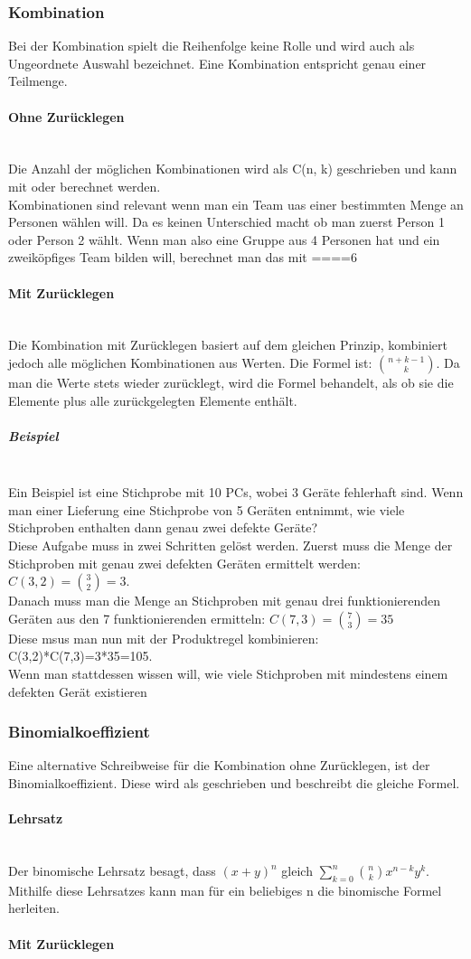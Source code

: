 \documentclass{article}
\newcommand{\paragraphlb}[1]{\paragraph{#1}\mbox{}\\}
\newcommand{\subparagraphlb}[1]{\subparagraph{#1}\mbox{}\\}
\begin{document}
	\subsubsection{Kombination}
	Bei der Kombination spielt die Reihenfolge keine Rolle und wird auch als Ungeordnete Auswahl bezeichnet. Eine Kombination entspricht genau einer Teilmenge. 
	\paragraphlb{Ohne Zurücklegen}
	Die Anzahl der möglichen Kombinationen wird als C(n, k) geschrieben und kann mit  oder  berechnet werden. \\
	Kombinationen sind relevant wenn man ein Team uas einer bestimmten Menge an Personen wählen will. Da es keinen Unterschied macht ob man zuerst Person 1 oder Person 2 wählt. Wenn man also eine Gruppe aus 4 Personen hat und ein zweiköpfiges Team bilden will, berechnet man das mit ====6
	\paragraphlb{Mit Zurücklegen}
	Die Kombination mit Zurücklegen basiert auf dem gleichen Prinzip, kombiniert jedoch alle möglichen Kombinationen aus Werten. Die Formel ist: $\binom{n+k-1}{k}$. Da man die Werte stets wieder zurücklegt, wird die Formel behandelt, als ob sie die Elemente plus alle zurückgelegten Elemente enthält.
	\subparagraphlb{Beispiel}
	Ein Beispiel ist eine Stichprobe mit 10 PCs, wobei 3 Geräte fehlerhaft sind. Wenn man einer Lieferung eine Stichprobe von 5 Geräten entnimmt, wie viele Stichproben enthalten dann genau zwei defekte Geräte? \\
	Diese Aufgabe muss in zwei Schritten gelöst werden. Zuerst muss die Menge der Stichproben mit genau zwei defekten Geräten ermittelt werden: $C(3,2)=\binom{3}{2}=3$. \\
	Danach muss man die Menge an Stichproben mit genau drei funktionierenden Geräten aus den 7 funktionierenden ermitteln: $C(7,3)=\binom{7}{3}=35$ \\
	Diese msus man nun mit der Produktregel kombinieren: C(3,2)*C(7,3)=3*35=105. \\
	Wenn man stattdessen wissen will, wie viele Stichproben mit mindestens einem defekten Gerät existieren
	\subsubsection{Binomialkoeffizient}
	Eine alternative Schreibweise für die Kombination ohne Zurücklegen, ist der Binomialkoeffizient. Diese wird als  geschrieben und beschreibt die gleiche Formel.
	\paragraphlb{Lehrsatz}
	Der binomische Lehrsatz besagt, dass $(x+y)^n$ gleich $\sum_{k=0}^{n}\binom{n}{k}x^{n-k}y^k$. Mithilfe diese Lehrsatzes kann man für ein beliebiges n die binomische Formel herleiten.
	\paragraphlb{Mit Zurücklegen}
\end{document}
